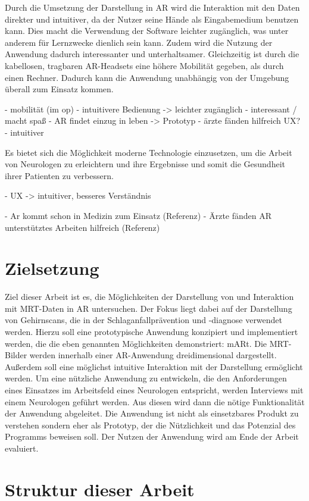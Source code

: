 Durch die Umsetzung der Darstellung in AR wird die Interaktion mit den Daten direkter und intuitiver, da der Nutzer seine Hände als Eingabemedium benutzen kann. Dies macht die Verwendung der Software leichter zugänglich, was unter anderem für Lernzwecke dienlich sein kann. 
Zudem wird die Nutzung der Anwendung dadurch interessanter und unterhaltsamer.
Gleichzeitig ist durch die kabellosen, tragbaren AR-Headsets eine höhere Mobilität gegeben, als durch einen Rechner. Dadurch kann die Anwendung unabhängig von der Umgebung überall zum Einsatz kommen.

- mobilität (im op)
- intuitivere Bedienung -> leichter zugänglich
- interessant / macht spaß
- AR findet einzug in leben -> Prototyp 
- ärzte fänden hilfreich
UX?
- intuitiver

Es bietet sich die Möglichkeit moderne Technologie einzusetzen, um die Arbeit von Neurologen zu erleichtern und ihre Ergebnisse und somit die Gesundheit ihrer Patienten zu verbessern.

- UX -> intuitiver, besseres Verständnis

- Ar kommt schon in Medizin zum Einsatz (Referenz)
- Ärzte fänden AR unterstütztes Arbeiten hilfreich (Referenz)


\section{Zielsetzung}

Ziel dieser Arbeit ist es, die Möglichkeiten der Darstellung von und Interaktion mit MRT-Daten in AR untersuchen. Der Fokus liegt dabei auf der Darstellung von Gehirnscans, die in der Schlaganfallprävention und -diagnose verwendet werden.
Hierzu soll eine prototypische Anwendung konzipiert und implementiert werden, die die eben genannten Möglichkeiten demonstriert: mARt.
Die MRT-Bilder werden innerhalb einer AR-Anwendung dreidimensional dargestellt. Außerdem soll eine möglichst intuitive Interaktion mit der Darstellung ermöglicht werden. 
Um eine nützliche Anwendung zu entwickeln, die den Anforderungen eines Einsatzes im Arbeitsfeld eines Neurologen entspricht, werden Interviews mit einem Neurologen geführt werden. Aus diesen wird dann die nötige Funktionalität der Anwendung abgeleitet. 
Die Anwendung ist nicht als einsetzbares Produkt zu verstehen sondern eher als Prototyp, der die Nützlichkeit und das Potenzial des Programms beweisen soll. Der Nutzen der Anwendung wird am Ende der Arbeit evaluiert.


\section{Struktur dieser Arbeit}

